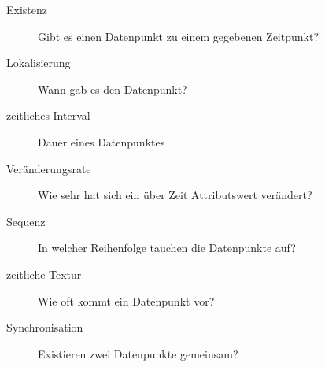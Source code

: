 \begin{description}
	\item[Existenz] Gibt es einen Datenpunkt zu einem gegebenen Zeitpunkt?
	\item[Lokalisierung] Wann gab es den Datenpunkt?
	\item[zeitliches Interval] Dauer eines Datenpunktes
	\item[Veränderungsrate] Wie sehr hat sich ein über Zeit Attributswert verändert?
	\item[Sequenz] In welcher Reihenfolge tauchen die Datenpunkte auf?
	\item[zeitliche Textur] Wie oft kommt ein Datenpunkt vor?
	\item[Synchronisation] Existieren zwei Datenpunkte gemeinsam?
\end{description}